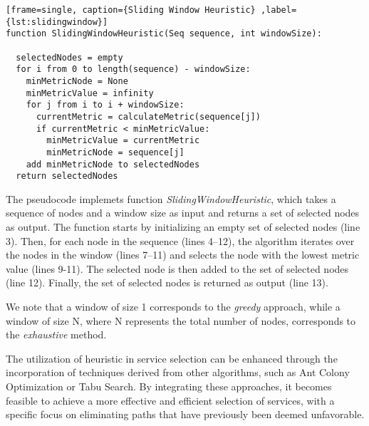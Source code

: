 \begin{lstlisting}[frame=single, caption={Sliding Window Heuristic} ,label={lst:slidingwindow}]
function SlidingWindowHeuristic(Seq sequence, int windowSize):

  selectedNodes = empty
  for i from 0 to length(sequence) - windowSize:
    minMetricNode = None
    minMetricValue = infinity
    for j from i to i + windowSize:
      currentMetric = calculateMetric(sequence[j])
      if currentMetric < minMetricValue:
        minMetricValue = currentMetric
        minMetricNode = sequence[j]
    add minMetricNode to selectedNodes
  return selectedNodes
\end{lstlisting}
The pseudocode implemets function {\em SlidingWindowHeuristic}, which takes a sequence of nodes and a window size as input and returns a set of selected nodes as output. The function starts by initializing an empty set of selected nodes (line 3). Then, for each node in the sequence (lines 4--12), the algorithm iterates over the nodes in the window (lines 7--11) and selects the node with the lowest metric value (lines 9-11). The selected node is then added to the set of selected nodes (line 12). Finally, the set of selected nodes is returned as output (line 13).

We note that a window of size 1 corresponds to the \emph{greedy} approach, while a window of size N, where N represents the total number of nodes, corresponds to the \emph{exhaustive} method.

The utilization of heuristic in service selection can be enhanced through the incorporation of techniques derived from other algorithms, such as Ant Colony Optimization or Tabu Search.
By integrating these approaches, it becomes feasible to achieve a more effective and efficient selection of services, with a specific focus on eliminating paths that have previously been deemed unfavorable.

